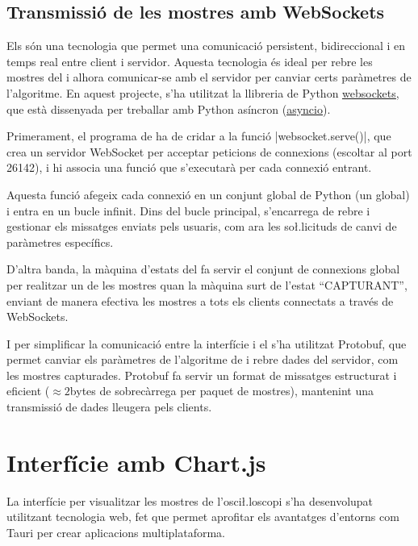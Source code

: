 \documentclass{tfgitic}[2023/06/30]
\begin{document}
\subsection{Transmissió de les mostres amb WebSockets}

Els \cite[WebSockets]{websockets} són una tecnologia que permet una
comunicació persistent, bidireccional i en temps real entre client i
servidor. Aquesta tecnologia és ideal per rebre les mostres del
 i alhora comunicar-se amb el servidor per canviar certs
paràmetres de l'algoritme. En aquest projecte, s'ha utilitzat la
llibreria de Python
\href{https://pypi.org/project/websockets/}{\underline{websockets}},
que està dissenyada per treballar amb Python asíncron
(\href{https://docs.python.org/3/library/asyncio.html}{\underline{asyncio}}).

Primerament, el programa de  ha de cridar a la funció
\ord|websocket.serve()|, que crea un servidor WebSocket per acceptar
peticions de connexions (escoltar al port 26142), i hi associa una
funció que s'executarà per cada connexió entrant.

Aquesta funció afegeix cada connexió en un conjunt global de Python
(un  global) i entra en un bucle infinit. Dins del bucle
principal, s'encarrega de rebre i gestionar els missatges enviats pels
usuaris, com ara les so\l.licituds de canvi de paràmetres específics.

D'altra banda, la màquina d'estats del  fa servir el
conjunt de connexions global per realitzar un  de les
mostres quan la màquina surt de l'estat ``CAPTURANT'', enviant de
manera efectiva les mostres a tots els clients connectats a través de
WebSockets.

I per simplificar la comunicació entre la interfície i el
 s'ha utilitzat Protobuf, que permet canviar els
paràmetres de l'algoritme de  i rebre dades del servidor,
com les mostres capturades. Protobuf fa servir un format de missatges
estructurat i eficient ($\approx 2$bytes de sobrecàrrega per paquet de
mostres), mantenint una transmissió de dades lleugera pels clients.

\section{Interfície amb Chart.js}

La interfície per visualitzar les mostres de l'osci\l.loscopi s'ha
desenvolupat utilitzant tecnologia web, fet que permet aprofitar els
avantatges d'entorns com Tauri per crear aplicacions multiplataforma.
\end{document}
